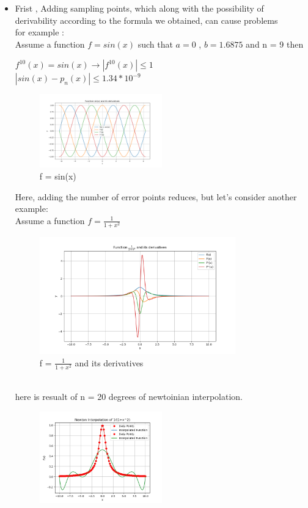 \documentclass[12pt]{article}
\begin{document}
\begin{itemize}
\item Frist , Adding sampling points, which along with the possibility of derivability according to the formula we obtained, can cause problems \\for example : \\
Assume a function $f = sin(x)$ such that $a = 0$ , $b = 1.6875$ and n = 9 then 
\begin{center}
$f^{10}(x) = sin(x) \rightarrow |f^{10}(x)| \le 1 $ \\
$|sin(x) - p_n(x)| \le 1.34*10^{-9}$
\end{center}
\begin{figure}[h]
    \centering
    \includegraphics[width=0.5\textwidth]{img/sin}
    \caption{f = sin(x)}
    \label{fig:mesh1}
\end{figure}
\newpage
Here, adding the number of error points reduces, but let's consider another example: \\
Assume a function $f = \frac{1}{1+x^2}$
\begin{figure}[h]
    \centering
    \includegraphics[width=0.8\textwidth]{img/gute}
    \caption{f = $\frac{1}{1+x^2}$ and its derivatives}
    \label{fig:mesh1}
\end{figure} \\
here is resualt of n = 20 degrees of newtoinian interpolation.
\begin{figure}[h]
    \centering
    \includegraphics[width=0.5\textwidth]{img/new}

\end{figure}
\end{itemize}
\end{document}
